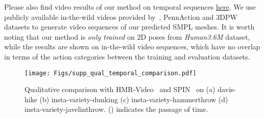\documentclass[10pt,twocolumn,letterpaper]{article}
\begin{document}
Please also find video results of our method on temporal sequences \href{https://www.youtube.com/playlist?list=PL46Tof4i1hsHK6D-y8oBSRK-DpmvfyVlf}{here}. We use publicly available in-the-wild videos provided by~\cite{kanazawa2019learning}, PennAction and 3DPW datasets to generate video sequences of our predicted SMPL meshes. It is worth noting that our method is \textit{only trained} on 2D poses from \textit{Human3.6M} dataset, while the results are shown on in-the-wild video sequences, which have no overlap in terms of the action categories between the training and evaluation datasets.


\begin{figure*}[t!]
	\centering
	\texttt{[image: Figs/supp\_qual\_temporal\_comparison.pdf]} 
	\caption{Qualitative comparison with HMR-Video~\cite{kanazawa2019learning} and SPIN~\cite{SPIN_ICCV2019} on (a) davis-hike (b) insta-variety-dunking (c)  insta-variety-hammerthrow (d) insta-variety-javelinthrow. () indicates the passage of time. }
	\label{fig:temporal_comparison}
\end{figure*}


   
\end{document}
